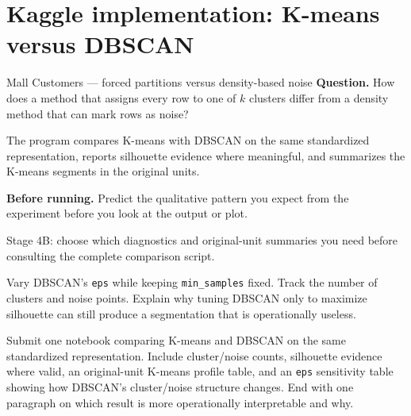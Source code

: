 \section{Kaggle implementation: K-means versus DBSCAN}
\label{sec:kaggle-mall-clustering}

\begin{kaggleproject}{Mall Customers --- forced partitions versus density-based noise}
\textbf{Question.} How does a method that assigns every row to one of $k$ clusters differ from a density method that can mark rows as noise?
\end{kaggleproject}

The program compares K-means with DBSCAN on the same standardized representation, reports silhouette evidence where meaningful, and summarizes the K-means segments in the original units.

\textbf{Before running.} Predict the qualitative pattern you expect from the experiment before you look at the output or plot.

\begin{labmode}
Stage 4B: choose which diagnostics and original-unit summaries you need before consulting the complete comparison script.
\end{labmode}




\begin{tryit}
Vary DBSCAN's \texttt{eps} while keeping \texttt{min\_samples} fixed. Track the number of clusters and noise points. Explain why tuning DBSCAN only to maximize silhouette can still produce a segmentation that is operationally useless.
\end{tryit}

\begin{labdeliverable}
Submit one notebook comparing K-means and DBSCAN on the same standardized representation. Include cluster/noise counts, silhouette evidence where valid, an original-unit K-means profile table, and an \texttt{eps} sensitivity table showing how DBSCAN's cluster/noise structure changes. End with one paragraph on which result is more operationally interpretable and why.
\end{labdeliverable}
